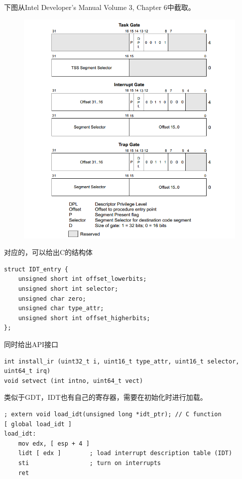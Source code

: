 \documentclass[logo,reportComp]{thesis}
\begin{document}
下图从Intel Developer's Manual Volume 3, Chapter 6中截取。
\begin{figure}[H]
\centering
\includegraphics[width=0.7\linewidth]{fig/idt.PNG}
\end{figure}

对应的，可以给出C的结构体
\begin{lstlisting}
struct IDT_entry {
	unsigned short int offset_lowerbits;
	unsigned short int selector;
	unsigned char zero;
	unsigned char type_attr;
	unsigned short int offset_higherbits;
};
\end{lstlisting}

同时给出API接口
\begin{lstlisting}
int install_ir (uint32_t i, uint16_t type_attr, uint16_t selector, uint64_t irq)
void setvect (int intno, uint64_t vect)
\end{lstlisting}

类似于GDT，IDT也有自己的寄存器，需要在初始化时进行加载。
\begin{lstlisting}[language={[x86masm]Assembler}]
; extern void load_idt(unsigned long *idt_ptr); // C function
[ global load_idt ]
load_idt:
	mov edx, [ esp + 4 ]
	lidt [ edx ]        ; load interrupt description table (IDT)
	sti                 ; turn on interrupts
	ret
\end{lstlisting}
\end{document}
